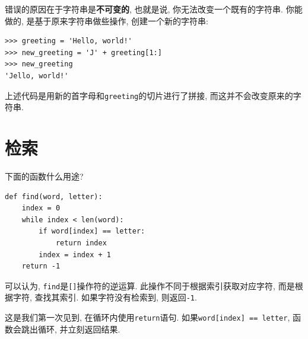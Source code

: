 \documentclass[10pt]{book}
\begin{document}
错误的原因在于字符串是{\bf 不可变的}, 
也就是说, 你无法改变一个既有的字符串. 
你能做的, 是基于原来字符串做些操作, 创建一个新的字符串:

\begin{verbatim}
>>> greeting = 'Hello, world!'
>>> new_greeting = 'J' + greeting[1:]
>>> new_greeting
'Jello, world!'
\end{verbatim}
%
上述代码是用新的首字母和{\tt greeting}的切片进行了拼接, 
而这并不会改变原来的字符串. 

\section{检索}
\label{find}
下面的函数什么用途?

\begin{verbatim}
def find(word, letter):
    index = 0
    while index < len(word):
        if word[index] == letter:
            return index
        index = index + 1
    return -1
\end{verbatim}
%
可以认为, {\tt find}是{\tt []}操作符的逆运算. 
此操作不同于根据索引获取对应字符, 
而是根据字符, 查找其索引. 如果字符没有检索到, 
则返回{\tt -1}. 

%
%
这是我们第一次见到, 在循环内使用{\tt return}语句. 
如果{\tt word[index] == letter}, 函数会跳出循环, 并立刻返回结果. 
\end{document}
